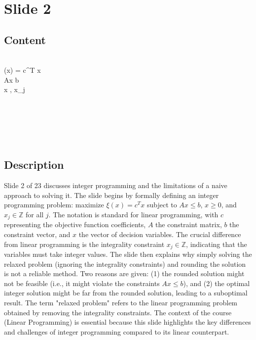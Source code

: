 \documentclass{article}%
\begin{document}
%
\newpage%
\section{Slide 2}%
\label{sec:Slide2}%
\subsection{Content}%

 \\
\max \quad \xi(x) = c^T x \\
 \quad Ax \le b \\
\quad x , \quad x_j \in {} \\
 \\
 \\
 \\
 \\
 \\
%
\subsection{Description}%
Slide 2 of 23 discusses integer programming and the limitations of a naive approach to solving it. The slide begins by formally defining an integer programming problem: maximize $\xi(x) = c^T x$ subject to $Ax \le b$, $x \ge 0$, and $x_j \in \mathbb{Z}$ for all $j$.  The notation is standard for linear programming, with $c$ representing the objective function coefficients, $A$ the constraint matrix, $b$ the constraint vector, and $x$ the vector of decision variables. The crucial difference from linear programming is the integrality constraint $x_j \in \mathbb{Z}$, indicating that the variables must take integer values. The slide then explains why simply solving the relaxed problem (ignoring the integrality constraints) and rounding the solution is not a reliable method. Two reasons are given: (1) the rounded solution might not be feasible (i.e., it might violate the constraints $Ax \le b$), and (2) the optimal integer solution might be far from the rounded solution, leading to a suboptimal result. The term "relaxed problem" refers to the linear programming problem obtained by removing the integrality constraints. The context of the course (Linear Programming) is essential because this slide highlights the key differences and challenges of integer programming compared to its linear counterpart.%
\end{document}
